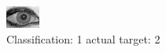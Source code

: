 \begin{figure}[h!]
\begin{center}
\includegraphics[width=0.60\columnwidth]{figures/ID2040_class_1_target_2.png}
\end{center}
\caption{ Classification: 1 actual target: 2}
\label{fig:ID2040_class_1_target_2}
\end{figure}
